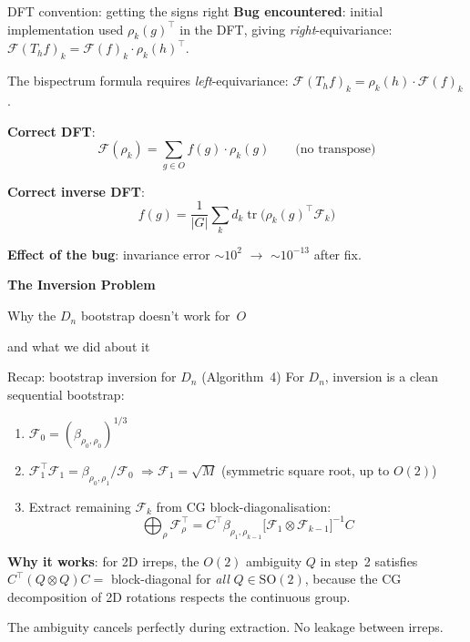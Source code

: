 \documentclass[aspectratio=169]{beamer}
\begin{document}
\begin{frame}{DFT convention: getting the signs right}
  \textbf{Bug encountered}: initial implementation used $\rho_k(g)^\top$ in the DFT,
  giving \emph{right}-equivariance: $\mathcal{F}(T_h f)_k = \mathcal{F}(f)_k \cdot \rho_k(h)^\top$.

  \medskip

  The bispectrum formula requires \emph{left}-equivariance:
  $\mathcal{F}(T_h f)_k = \rho_k(h) \cdot \mathcal{F}(f)_k$.

  \bigskip

  \textbf{Correct DFT}:
  \[
    \mathcal{F}(\rho_k) = \sum_{g \in O} f(g) \cdot \rho_k(g) \qquad \text{(no transpose)}
  \]

  \textbf{Correct inverse DFT}:
  \[
    f(g) = \frac{1}{|G|} \sum_k d_k \operatorname{tr}\bigl(\rho_k(g)^\top \mathcal{F}_k\bigr)
  \]

  \medskip

  \textbf{Effect of the bug}: invariance error $\sim 10^2$ $\to$ $\sim 10^{-13}$ after fix.
\end{frame}

\begin{frame}{}
  \vfill
  \centering
  {\Large\textbf{The Inversion Problem}}

  \medskip

  {\normalsize Why the $D_n$ bootstrap doesn't work for~$O$}

  \smallskip

  {\small and what we did about it}
  \vfill
\end{frame}

\begin{frame}{Recap: bootstrap inversion for $D_n$ (Algorithm~4)}
  For $D_n$, inversion is a clean sequential bootstrap:

  \begin{enumerate}
    \item $\mathcal{F}_0 = (\beta_{\rho_0,\rho_0})^{1/3}$
    \item $\mathcal{F}_1^\top \mathcal{F}_1 = \beta_{\rho_0,\rho_1} / \mathcal{F}_0$
          \quad$\Rightarrow$\quad $\mathcal{F}_1 = \sqrt{M}$ (symmetric square root, up to $O(2)$)
    \item Extract remaining $\mathcal{F}_k$ from CG block-diagonalisation:
    \[
      \bigoplus_\rho \mathcal{F}_\rho^\top
      = C^\top \beta_{\rho_1,\rho_{k-1}} \bigl[\mathcal{F}_1 \otimes \mathcal{F}_{k-1}\bigr]^{-1} C
    \]
  \end{enumerate}

  \bigskip

  \textbf{Why it works}: for 2D irreps, the $O(2)$ ambiguity $Q$ in step~2 satisfies
  $C^\top (Q \otimes Q) C = $ block-diagonal for \emph{all} $Q \in \mathrm{SO}(2)$,
  because the CG decomposition of 2D rotations respects the continuous group.

  \medskip

  The ambiguity cancels perfectly during extraction. No leakage between irreps.
\end{frame}
\end{document}
